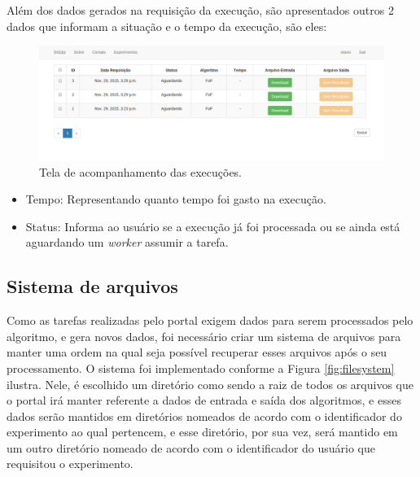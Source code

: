 \documentclass[tg]{mdtufsm}
\begin{document}
Além dos dados gerados na requisição da execução, são apresentados outros 2 dados que informam a situação e o tempo da execução, são eles:
\begin{figure}
	\centering
	\includegraphics[width=1\textwidth]{userhome}
	\caption{
		Tela de acompanhamento das execuções.
	}
	\label{fig:funcional}
\end{figure}
\begin{itemize}
	\item Tempo: Representando quanto tempo foi gasto na execução.
	\item Status: Informa ao usuário se a execução já foi processada ou se ainda está aguardando um \emph{worker} assumir a tarefa.
\end{itemize}


\subsection{Sistema de arquivos}

Como as tarefas realizadas pelo portal exigem dados para serem processados pelo algoritmo, e gera novos dados, foi necessário criar um sistema de arquivos para manter uma ordem na qual seja possível recuperar esses arquivos após o seu processamento.
O sistema foi implementado conforme a Figura  \ref{fig:filesystem} ilustra. Nele, é escolhido um diretório como sendo a raiz de todos os arquivos que o portal irá manter referente a dados de entrada e saída dos algoritmos, e esses dados serão mantidos em diretórios nomeados de acordo com o identificador do experimento ao qual pertencem, e esse diretório, por sua vez, será mantido em um outro diretório nomeado de acordo com o identificador do usuário que requisitou o experimento.
\end{document}
